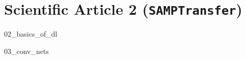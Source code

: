\documentclass[whitelogo]{TUD-report2020}
\def\samptr{\texttt{SAMPTransfer}}
\begin{document}
\chapter{Scientific Article 2 (\samptr)}\label{chap:samp-transfer-art}

% 

% 
{02_basics_of_dl}

{03_conv_nets}















\appendix

%

\printbibliography
\end{document}
